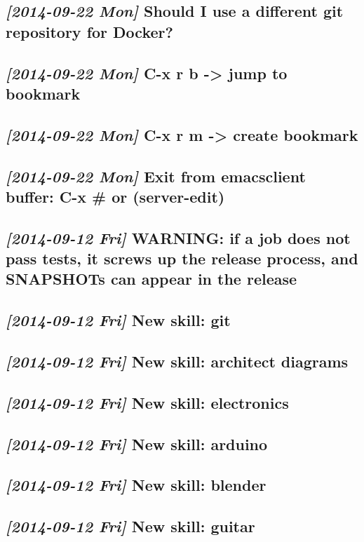 \documentclass[11pt]{article}
\begin{document}
\subsection{\textit{[2014-09-22 Mon]} Should I use a different git repository for Docker?}
\label{sec-1-6}
\subsection{\textit{[2014-09-22 Mon]} C-x r b -> jump to bookmark}
\label{sec-1-7}
\subsection{\textit{[2014-09-22 Mon]} C-x r m -> create bookmark}
\label{sec-1-8}
\subsection{\textit{[2014-09-22 Mon]} Exit from emacsclient buffer: C-x \# or (server-edit)}
\label{sec-1-9}
\subsection{\textit{[2014-09-12 Fri]} WARNING: if a job does not pass tests, it screws up the release process, and SNAPSHOTs can appear in the release}
\label{sec-1-10}
\subsection{\textit{[2014-09-12 Fri]} New skill: git}
\label{sec-1-11}
\subsection{\textit{[2014-09-12 Fri]} New skill: architect diagrams}
\label{sec-1-12}
\subsection{\textit{[2014-09-12 Fri]} New skill: electronics}
\label{sec-1-13}
\subsection{\textit{[2014-09-12 Fri]} New skill: arduino}
\label{sec-1-14}
\subsection{\textit{[2014-09-12 Fri]} New skill: blender}
\label{sec-1-15}
\subsection{\textit{[2014-09-12 Fri]} New skill: guitar}
\label{sec-1-16}
\end{document}
